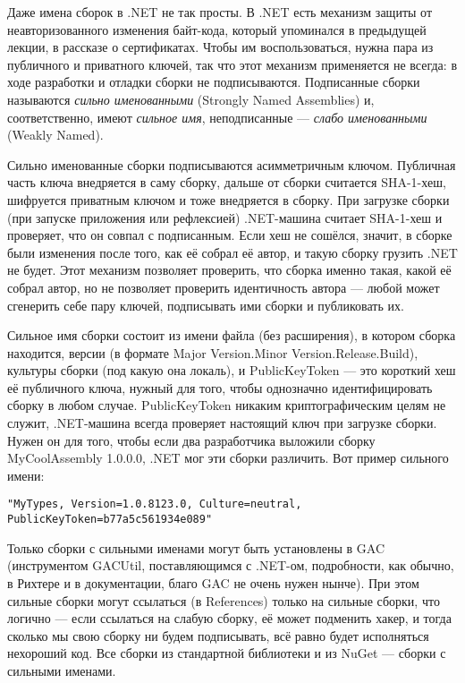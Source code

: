 \documentclass[a5paper]{article}
\begin{document}
Даже имена сборок в .NET не так просты. В .NET есть механизм защиты от неавторизованного изменения байт-кода, который упоминался в предыдущей лекции, в рассказе о сертификатах. Чтобы им воспользоваться, нужна пара из публичного и приватного ключей, так что этот механизм применяется не всегда: в ходе разработки и отладки сборки не подписываются. Подписанные сборки называются \textit{сильно именованными} (Strongly Named Assemblies) и, соответственно, имеют \textit{сильное имя}, неподписанные --- \textit{слабо именованными} (Weakly Named).

Сильно именованные сборки подписываются асимметричным ключом. Публичная часть ключа внедряется в саму сборку, дальше от сборки считается SHA-1-хеш, шифруется приватным ключом и тоже внедряется в сборку. При загрузке сборки (при запуске приложения или рефлексией) .NET-машина считает SHA-1-хеш и проверяет, что он совпал с подписанным. Если хеш не сошёлся, значит, в сборке были изменения после того, как её собрал её автор, и такую сборку грузить .NET не будет. Этот механизм позволяет проверить, что сборка именно такая, какой её собрал автор, но не позволяет проверить идентичность автора --- любой может сгенерить себе пару ключей, подписывать ими сборки и публиковать их.

Сильное имя сборки состоит из имени файла (без расширения), в котором сборка находится, версии (в формате Major Version.Minor Version.Release.Build), культуры сборки (под какую она локаль), и PublicKeyToken --- это короткий хеш её публичного ключа, нужный для того, чтобы однозначно идентифицировать сборку в любом случае. PublicKeyToken никаким криптографическим целям не служит, .NET-машина всегда проверяет настоящий ключ при загрузке сборки. Нужен он для того, чтобы если два разработчика выложили сборку MyCoolAssembly 1.0.0.0, .NET мог эти сборки различить. Вот пример сильного имени:

\begin{verbatim}
"MyTypes, Version=1.0.8123.0, Culture=neutral, PublicKeyToken=b77a5c561934e089"
\end{verbatim}

Только сборки с сильными именами могут быть установлены в GAC (инструментом GACUtil, поставляющимся с .NET-ом, подробности, как обычно, в Рихтере и в документации, благо GAC не очень нужен нынче). При этом сильные сборки могут ссылаться (в References) только на сильные сборки, что логично --- если ссылаться на слабую сборку, её может подменить хакер, и тогда сколько мы свою сборку ни будем подписывать, всё равно будет исполняться нехороший код. Все сборки из стандартной библиотеки и из NuGet --- сборки с сильными именами.
\end{document}
